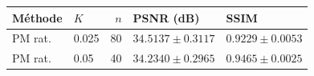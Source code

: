\begin{tabular}{llrll}
\toprule
Méthode & $K$ & $n$ & PSNR (dB) & SSIM \\
\midrule
PM rat. & 0.025 & 80 & $34.5137 \pm 0.3117$ & $0.9229 \pm 0.0053$ \\
PM rat. & 0.05 & 40 & $34.2340 \pm 0.2965$ & $0.9465 \pm 0.0025$ \\
\bottomrule
\end{tabular}
